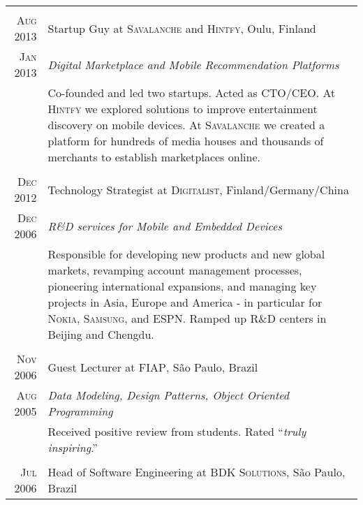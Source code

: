 \documentclass[a4paper,10pt]{article}
\begin{document}
\begin{tabular}{r|p{14cm}}
  \multicolumn{2}{c}{}\\

  \textsc{Aug 2013} & Startup Guy at \textsc{Savalanche} and \textsc{Hintfy}, Oulu, Finland \\

  \textsc{Jan 2013} & \emph{Digital Marketplace and Mobile Recommendation Platforms} \\

  &\footnotesize{Co-founded and led two startups. Acted as \textsc{CTO/CEO}. At
    \textsc{Hintfy} we explored solutions to improve entertainment discovery on
    mobile devices. At \textsc{Savalanche} we created a platform for hundreds of
    media houses and thousands of merchants to establish marketplaces online.}\\

  \multicolumn{2}{c}{}\\

  \textsc{Dec 2012} & Technology Strategist at \textsc{Digitalist},
  Finland/Germany/China \\

  \textsc{Dec 2006} & \emph{R\&D services for Mobile and Embedded Devices} \\

  &\footnotesize{Responsible for developing new products and new global markets,
    revamping account management processes, pioneering international expansions,
    and managing key projects in Asia, Europe and America - in particular for
    \textsc{Nokia}, \textsc{Samsung}, and \textsc{ESPN}. Ramped up R\&D centers
    in Beijing and Chengdu.}\\

  \multicolumn{2}{c}{}\\

  \textsc{Nov 2006} & Guest Lecturer at \textsc{FIAP}, S\~{a}o Paulo, Brazil \\

  \textsc{Aug 2005} & \emph{Data Modeling, Design Patterns, Object Oriented
    Programming} \\

  &\footnotesize{Received positive review from students. Rated ``\emph{truly
      inspiring}.''}\\

  \multicolumn{2}{c}{}\\

  \textsc{Jul 2006} & Head of Software Engineering at \textsc{BDK
    Solutions}, S\~{a}o Paulo, Brazil \\


\end{tabular}
\end{document}
